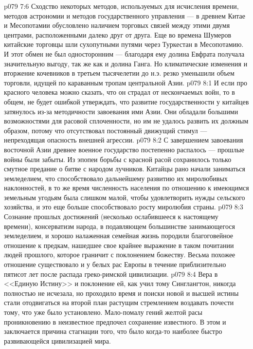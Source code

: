 \vs p079 7:6 Сходство некоторых методов, используемых для исчисления времени, методов астрономии и методов государственного управления --- в древнем Китае и Месопотамии обусловлено наличием торговых связей между этими двумя центрами, расположенными далеко друг от друга. Еще во времена Шумеров китайские торговцы шли сухопутными путями через Туркестан в Месопотамию. И этот обмен не был односторонним --- благодаря ему долина Евфрата получала значительную выгоду, так же как и долина Ганга. Но климатические изменения и вторжение кочевников в третьем тысячелетии до н.э. резко уменьшили объем торговли, идущей по караванным тропам центральной Азии.
\vs p079 8:1 И если про красного человека можно сказать, что он страдал от нескончаемых войн, то в общем, не будет ошибкой утверждать, что развитие государственности у китайцев затянулось из\hyp{}за методичности завоевания ими Азии. Они обладали большими возможностями для расовой сплоченности, но им не удалось развить их должным образом, потому что отсутствовал постоянный движущий стимул --- непреходящая опасность внешней агрессии.
\vs p079 8:2 С завершением завоевания восточной Азии древнее военное государство постепенно распалось --- прошлые войны были забыты. Из эпопеи борьбы с красной расой сохранилось только смутное предание о битве с народом лучников. Китайцы рано начали заниматься земледелием, что способствовало дальнейшему развитию их миролюбивых наклонностей, в то же время численность населения по отношению к имеющимся земельным угодьям была слишком малой, чтобы удовлетворить нужды сельского хозяйства, и это еще больше способствовало росту миролюбия страны.
\vs p079 8:3 Сознание прошлых достижений (несколько ослабившееся к настоящему времени), консерватизм народа, в подавляющем большинстве занимающегося земледелием, и хорошо налаженная семейная жизнь породили благоговейное отношение к предкам, нашедшее свое крайнее выражение в таком почитании людей прошлого, которое граничит с поклонением божеству. Весьма похожее отношение существовало и у белых рас Европы в течение приблизительно пятисот лет после распада греко\hyp{}римской цивилизации.
\vs p079 8:4 Вера в <<Единую Истину>> и поклонение ей, как учил тому Синглангтон, никогда полностью не исчезала, но проходило время и поиски новой и высшей истины стали отодвигаться на второй план растущим стремлением воздавать почести тому, что уже было установлено. Мало\hyp{}помалу гений желтой расы проникновению в неизвестное предпочел сохранение известного. В этом и заключается причина стагнации того, что было когда\hyp{}то наиболее быстро развивающейся цивилизацией мира.
